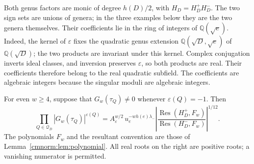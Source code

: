 Both genus factors are monic of degree $h(D)/2$, with
$H_D=H_D^+H_D^-$. The two sign sets are unions of genera; in the
three examples below they are the two genera themselves.
Their coefficients lie in the ring of integers of
$\mathbb Q(\sqrt e)$. Indeed, the kernel of $\varepsilon$ fixes the
quadratic genus extension $\mathbb Q(\sqrt D,\sqrt e)$ of
$\mathbb Q(\sqrt D)$; the two products are invariant under this kernel.
Complex conjugation inverts ideal classes, and inversion preserves
$\varepsilon$, so both products are real. Their coefficients therefore
belong to the real quadratic subfield. The coefficients are algebraic
integers because the singular moduli are algebraic integers.

\begin{theorem}
\label{cmgenus:thm:allweights}
For even $w\geq4$, suppose that $G_w(\tau_Q)\neq0$ whenever
$\varepsilon(Q)=-1$. Then
\begin{equation}
 \prod_{Q\in\mathcal Q_D}|G_w(\tau_Q)|^{\varepsilon(Q)}
 =A_\varepsilon^{w/2}\,
   u_e^{-w h(e)\lambda_-}
   \left|
    \frac{\operatorname{Res}(H_D^+,F_w)}
         {\operatorname{Res}(H_D^-,F_w)}
   \right|^{1/12}.
 \label{cmgenus:eq:allweights}
\end{equation}
The polynomials $F_w$ and the resultant convention are those of
Lemma~\ref{cmnorm:lem:polynomial}. All real roots on the right are
positive roots; a vanishing numerator is permitted.
\end{theorem}

